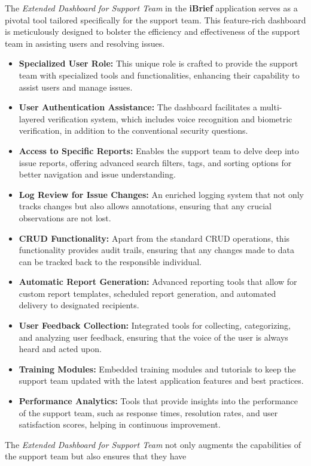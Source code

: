 The \textit{Extended Dashboard for Support Team} in the \textbf{iBrief} application serves as a pivotal tool tailored specifically for the support team. This feature-rich dashboard is meticulously designed to bolster the efficiency and effectiveness of the support team in assisting users and resolving issues.

\begin{itemize}
    \item \textbf{Specialized User Role:}
    This unique role is crafted to provide the support team with specialized tools and functionalities, enhancing their capability to assist users and manage issues.
    
    \item \textbf{User Authentication Assistance:}
    The dashboard facilitates a multi-layered verification system, which includes voice recognition and biometric verification, in addition to the conventional security questions.
    
    \item \textbf{Access to Specific Reports:}
    Enables the support team to delve deep into issue reports, offering advanced search filters, tags, and sorting options for better navigation and issue understanding.
    
    \item \textbf{Log Review for Issue Changes:}
    An enriched logging system that not only tracks changes but also allows annotations, ensuring that any crucial observations are not lost.
    
    \item \textbf{CRUD Functionality:}
    Apart from the standard CRUD operations, this functionality provides audit trails, ensuring that any changes made to data can be tracked back to the responsible individual.
    
    \item \textbf{Automatic Report Generation:}
    Advanced reporting tools that allow for custom report templates, scheduled report generation, and automated delivery to designated recipients.
    
    \item \textbf{User Feedback Collection:}
    Integrated tools for collecting, categorizing, and analyzing user feedback, ensuring that the voice of the user is always heard and acted upon.
    
    \item \textbf{Training Modules:}
    Embedded training modules and tutorials to keep the support team updated with the latest application features and best practices.
    
    \item \textbf{Performance Analytics:}
    Tools that provide insights into the performance of the support team, such as response times, resolution rates, and user satisfaction scores, helping in continuous improvement.
\end{itemize}

The \textit{Extended Dashboard for Support Team} not only augments the capabilities of the support team but also ensures that they have

